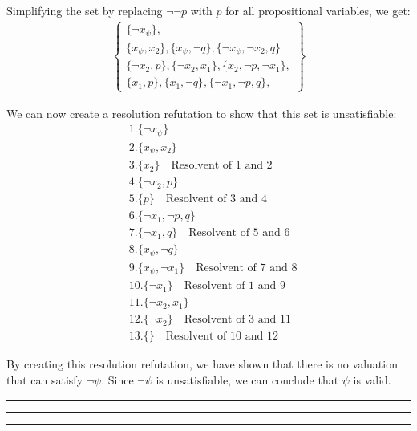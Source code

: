 \documentclass[12pt,letterpaper, onecolumn]{exam}
\begin{document}
\begin{questions}
	Simplifying the set by replacing $ \neg \neg p $ with $ p $ for all propositional variables, we get:
	\begin{align*}
		\left .
			\begin{cases}
				\{ \neg x_{\psi} \}, \\
				\{ x_{\psi}, x_2 \}, \{ x_{\psi}, \neg q \}, \{ \neg x_{\psi}, \neg x_2, q \} \\
				\{ \neg x_2, p \}, \{ \neg x_2, x_1 \}, \{ x_2, \neg p, \neg x_1  \}, \\
				\{ x_1, p \}, \{ x_1, \neg q \}, \{ \neg x_1, \neg p, q \},
			\end{cases}
		\right\}
	\end{align*}

	We can now create a resolution refutation to show that this set is unsatisfiable:
	\begin{align*}
		& 1. \{ \neg x_{\psi} \} \\
		& 2. \{ x_{\psi}, x_2 \} \\
		& 3. \{ x_2 \} \quad \text{Resolvent of 1 and 2} \\
		& 4. \{ \neg x_2, p \} \\
		& 5. \{ p \} \quad \text{Resolvent of 3 and 4} \\
		& 6. \{ \neg x_1, \neg p, q \} \\
		& 7. \{ \neg x_1, q \} \quad \text{Resolvent of 5 and 6} \\
		& 8. \{ x_{\psi}, \neg q \} \\ 
		& 9. \{ x_{\psi}, \neg x_1 \} \quad \text{Resolvent of 7 and 8} \\
		& 10. \{ \neg x_1 \} \quad \text{Resolvent of 1 and 9} \\
		& 11. \{ \neg x_2, x_1 \} \\
		& 12. \{ \neg x_2 \} \quad \text{Resolvent of 3 and 11} \\
		& 13. \{  \} \quad \text{Resolvent of 10 and 12}
	\end{align*}

	By creating this resolution refutation, we have shown that there is no valuation that can satisfy $ \neg \psi $.
	Since $ \neg \psi $ is unsatisfiable, we can conclude that $ \psi $ is valid.


    {\rule{17cm}{0.4pt}}
	\question[]
	\solutiontitle

    {\rule{17cm}{0.4pt}}
	\question[]
	\solutiontitle

    {\rule{17cm}{0.4pt}}

\end{questions}
\end{document}
